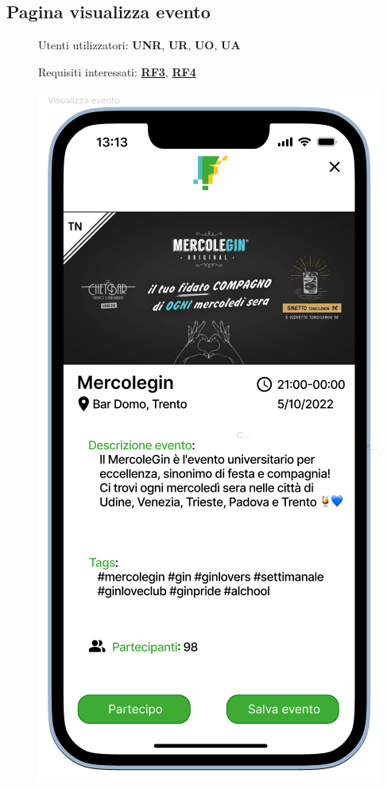 \documentclass{article}
\begin{document}
\subsection{Pagina visualizza evento}
\begin{description}
    \item[] Utenti utilizzatori: \textbf{UNR}, \textbf{UR}, \textbf{UO}, \textbf{UA}
    \item[] Requisiti interessati: \hyperref[rf_3]{\textbf{RF3}}, \hyperref[rf_4]{\textbf{RF4}}
    \item[] \begin{center}
            \includegraphics[scale=0.6]{Visualizza_Evento.png}

\end{center}
\end{description}
\end{document}
